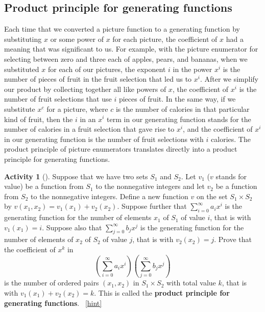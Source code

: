 \documentclass[10pt,]{book}
\newcommand{\terminology}[1]{\textbf{#1}}
\theoremstyle{plain}
\theoremstyle{definition}
\theoremstyle{definition}
\theoremstyle{definition}
\newtheorem{activity}[project]{Activity}
\numberwithin{equation}{chapter}
\begin{document}
\subsection[{Product principle for generating functions}]{Product principle for generating functions}\label{subsection-34}
\hypertarget{p-1300}{}%
Each time that we converted a picture function to a generating function by substituting \(x\) or some power of \(x\) for each picture, the coefficient of \(x\) had a meaning that was significant to us. For example, with the picture enumerator for selecting between zero and three each of apples, pears, and bananas, when we substituted \(x\) for each of our pictures, the exponent \(i\) in the power \(x^i\) is the number of pieces of fruit in the fruit selection that led us to \(x^i\). After we simplify our product by collecting together all like powers of \(x\), the coefficient of \(x^i\) is the number of fruit selections that use \(i\) pieces of fruit. In the same way, if we substitute \(x^c\) for a picture, where \(c\) is the number of calories in that particular kind of fruit, then the \(i\) in an \(x^i\) term in our generating function stands for the number of calories in a fruit selection that gave rise to \(x^i\), and the coefficient of \(x^i\) in our generating function is the number of fruit selections with \(i\) calories.  The product principle of picture enumerators translates directly into a product principle for generating functions.%
\begin{activity}[]\label{ProductPrincipleOGF}
\hypertarget{p-1301}{}%
Suppose that we have two sets \(S_1\) and \(S_2\). Let \(v_1\) (\(v\) stands for value) be a function from \(S_1\) to the nonnegative integers and let \(v_2\) be a function from \(S_2\) to the nonnegative integers.  Define a new function \(v\) on the set \(S_1 \times S_2\) by \(v(x_1,x_2) = v_1(x_1) +v_2(x_2)\). Suppose further that \(\sum_{i=0}^\infty a_ix^i\) is the generating function for the number of elements \(x_1\) of \(S_1\) of value \(i\), that is with \(v_1(x_1)=i\). Suppose also that \(\sum_{j=0}^\infty b_j x^j\) is the generating function for the number of elements of \(x_2\) of \(S_2\) of value \(j\), that is with \(v_2(x_2) = j\).  Prove that the coefficient of \(x^k\) in%
\begin{equation*}
\left(\sum_{i=0}^\infty a_ix^i\right)\left(\sum_{j=0}^\infty
b_jx^j\right)
\end{equation*}
is the number of ordered pairs \((x_1,x_2)\) in \(S_1\times S_2\) with total value \(k\), that is with \(v_1(x_1) +v_2(x_2) =k\). This is called the \terminology{product principle for generating functions}.%
~\hfill{\tiny\hyperlink{a-249}{[hint]}\hypertarget{q-249}{}}\end{activity}
\end{document}
